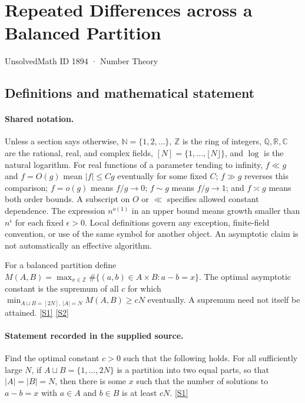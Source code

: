 \documentclass[11pt,a4paper]{article}
\newcommand{\N}{\mathbb{N}}
\newcommand{\Z}{\mathbb{Z}}
\newcommand{\Q}{\mathbb{Q}}
\newcommand{\R}{\mathbb{R}}
\newcommand{\C}{\mathbb{C}}
\newcommand{\sref}[2]{\hyperlink{source:#1:#2}{[S#2]}}
\begin{document}

\setcounter{section}{1893}

\section{Repeated Differences across a Balanced Partition}\label{1894}

{\small\sffamily UnsolvedMath ID 1894 · Number Theory}

\subsection{Definitions and mathematical statement}

\paragraph{Shared notation.}Unless a section says otherwise, $\N=\{1,2,\ldots\}$,
$\Z$ is the ring of integers, $\Q,\R,\C$ are the rational, real, and complex
fields, $[N]=\{1,\ldots,\lfloor N\rfloor\}$, and $\log$ is the natural
logarithm. For real functions of a parameter tending to infinity,
$f\ll g$ and $f=O(g)$ mean $|f|\leq Cg$ eventually for some fixed $C$;
$f\gg g$ reverses this comparison; $f=o(g)$ means $f/g\to0$;
$f\sim g$ means $f/g\to1$; and $f\asymp g$ means both order bounds.
A subscript on $O$ or $\ll$ specifies allowed constant dependence.
The expression $n^{o(1)}$ in an upper bound means growth smaller than
$n^\epsilon$ for each fixed $\epsilon>0$. Local definitions govern any
exception, finite-field convention, or use of the same symbol for another
object. An asymptotic claim is not automatically an effective algorithm.



For a balanced partition define $M(A,B)=\max_{x\in\Z}\#\{(a,b)\in A\times B:a-b=x\}$. The optimal asymptotic constant is the supremum of all $c$ for which $\min_{A\sqcup B=[2N],\,|A|=N}M(A,B)\geq cN$ eventually. A supremum need not itself be attained. \sref{1894}{1} \sref{1894}{2}

\paragraph{Statement recorded in the supplied source.}
Find the optimal constant $c>0$ such that the following holds.
For all sufficiently large $N$, if $A\sqcup B=\{1,\ldots,2N\}$ is a partition into two equal parts, so that $\lvert A\rvert=\lvert B\rvert=N$, then there is some $x$ such that the number of solutions to $a-b=x$ with $a\in A$ and $b\in B$ is at least $cN$. \sref{1894}{1}
\end{document}
